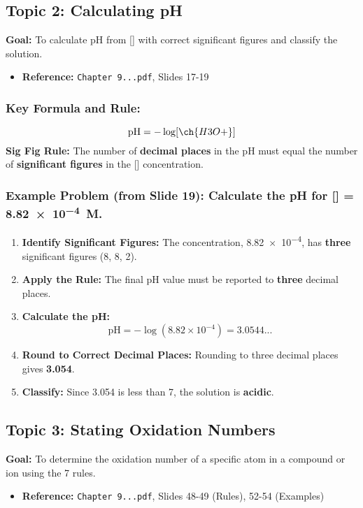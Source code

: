 \documentclass{article}
\begin{document}
\subsection*{Topic 2: Calculating pH}
\textbf{Goal:} To calculate pH from [] with correct significant figures and classify the solution.
\begin{itemize}[itemsep=5pt]
    \item \textbf{Reference:} \texttt{Chapter 9...pdf}, Slides 17-19
\end{itemize}
\subsubsection*{Key Formula and Rule:}
\[ \text{pH} = -\log[\ch{H3O+}] \]
\textbf{Sig Fig Rule:} The number of \textbf{decimal places} in the pH must equal the number of \textbf{significant figures} in the [] concentration.

\subsubsection*{Example Problem (from Slide 19): Calculate the pH for [] = \SI{8.82e-4}{M}.}
\begin{enumerate}[label=\textbf{Step \arabic*:}, itemsep=5pt]
    \item \textbf{Identify Significant Figures:} The concentration, \num{8.82e-4}, has \textbf{three} significant figures (8, 8, 2).
    \item \textbf{Apply the Rule:} The final pH value must be reported to \textbf{three} decimal places.
    \item \textbf{Calculate the pH:}
    \[ \text{pH} = -\log(8.82 \times 10^{-4}) = 3.0544... \]
    \item \textbf{Round to Correct Decimal Places:} Rounding to three decimal places gives \textbf{3.054}.
    \item \textbf{Classify:} Since 3.054 is less than 7, the solution is \textbf{acidic}.
\end{enumerate}

\subsection*{Topic 3: Stating Oxidation Numbers}
\textbf{Goal:} To determine the oxidation number of a specific atom in a compound or ion using the 7 rules.
\begin{itemize}[itemsep=5pt]
    \item \textbf{Reference:} \texttt{Chapter 9...pdf}, Slides 48-49 (Rules), 52-54 (Examples)
\end{itemize}
\end{document}
